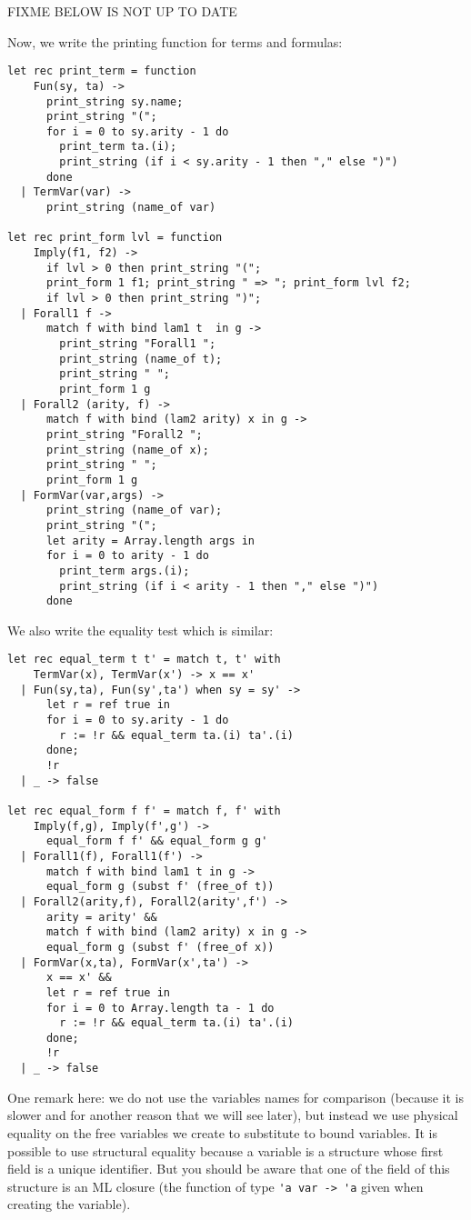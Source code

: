 \documentclass[11pt]{article}
\begin{document}
FIXME BELOW IS NOT UP TO DATE

Now, we write the printing function for terms and formulas:

\begin{verbatim}
let rec print_term = function
    Fun(sy, ta) ->
      print_string sy.name;
      print_string "(";
      for i = 0 to sy.arity - 1 do
        print_term ta.(i);
        print_string (if i < sy.arity - 1 then "," else ")")
      done
  | TermVar(var) ->
      print_string (name_of var)

let rec print_form lvl = function
    Imply(f1, f2) ->
      if lvl > 0 then print_string "(";
      print_form 1 f1; print_string " => "; print_form lvl f2;
      if lvl > 0 then print_string ")";
  | Forall1 f ->
      match f with bind lam1 t  in g ->
        print_string "Forall1 ";
        print_string (name_of t);
        print_string " ";
        print_form 1 g
  | Forall2 (arity, f) ->
      match f with bind (lam2 arity) x in g ->
      print_string "Forall2 ";
      print_string (name_of x);
      print_string " ";
      print_form 1 g
  | FormVar(var,args) ->
      print_string (name_of var);
      print_string "(";
      let arity = Array.length args in
      for i = 0 to arity - 1 do
        print_term args.(i);
        print_string (if i < arity - 1 then "," else ")")
      done
\end{verbatim}

We also write the equality test which is similar:
\begin{verbatim}
let rec equal_term t t' = match t, t' with
    TermVar(x), TermVar(x') -> x == x'
  | Fun(sy,ta), Fun(sy',ta') when sy = sy' ->
      let r = ref true in
      for i = 0 to sy.arity - 1 do
        r := !r && equal_term ta.(i) ta'.(i)
      done;
      !r
  | _ -> false

let rec equal_form f f' = match f, f' with
    Imply(f,g), Imply(f',g') ->
      equal_form f f' && equal_form g g'
  | Forall1(f), Forall1(f') ->
      match f with bind lam1 t in g ->
      equal_form g (subst f' (free_of t))
  | Forall2(arity,f), Forall2(arity',f') ->
      arity = arity' &&
      match f with bind (lam2 arity) x in g ->
      equal_form g (subst f' (free_of x))
  | FormVar(x,ta), FormVar(x',ta') ->
      x == x' &&
      let r = ref true in
      for i = 0 to Array.length ta - 1 do
        r := !r && equal_term ta.(i) ta'.(i)
      done;
      !r
  | _ -> false
\end{verbatim}

One remark here: we do not use the variables names for comparison
(because it is slower and for another reason that we will see later),
but instead we use physical equality on the free variables we create to substitute to
bound variables.
It is possible to use structural equality because a
variable is a structure whose first field is a unique identifier. But
you should be aware that one of the field of this structure is an ML
closure (the function of type \verb#'a var -> 'a# given when
creating the variable).
\end{document}
